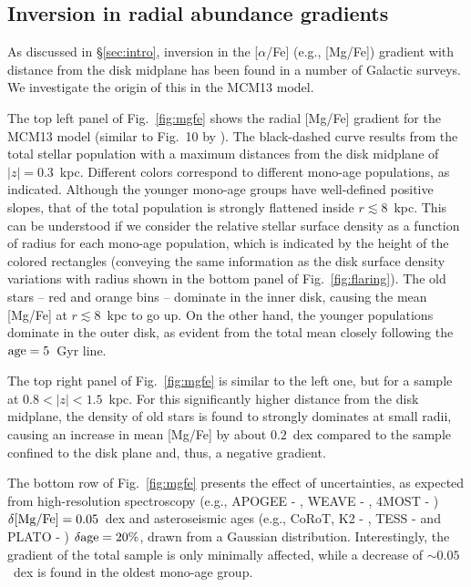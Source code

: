 \documentclass[usenatbib]{mnras}
\begin{document}
\subsection{Inversion in radial abundance gradients}
\label{sec:grad}

As discussed in \S\ref{sec:intro}, inversion in the [$\alpha$/Fe] (e.g., [Mg/Fe]) gradient with distance from the disk midplane has been found in a number of Galactic surveys. We investigate the origin of this in the MCM13 model.

The top left panel of Fig.~\ref{fig:mgfe} shows the radial [Mg/Fe] gradient for the MCM13 model (similar to Fig.~10 by \citealt{mcm14}). The black-dashed curve results from the total stellar population with a maximum distances from the disk midplane of $|z|=0.3$~kpc. Different colors correspond to different mono-age populations, as indicated. Although the younger mono-age groups have well-defined positive slopes, that of the total population is strongly flattened inside $r\lesssim8$~kpc. This can be understood if we consider the relative stellar surface density as a function of radius for each mono-age population, which is indicated by the height of the colored rectangles (conveying the same information as the disk surface density variations with radius shown in the bottom panel of Fig.~\ref{fig:flaring}). The old stars -- red and orange bins -- dominate in the inner disk, causing the mean [Mg/Fe] at $r\lesssim8$~kpc to go up. On the other hand, the younger populations dominate in the outer disk, as evident from the total mean closely following the $\rm age=5$~Gyr line.

The top right panel of Fig.~\ref{fig:mgfe} is similar to the left one, but for a sample at $0.8<|z|<1.5$~kpc. For this significantly higher distance from the disk midplane, the density of old stars is found to strongly dominates at small radii, causing an increase in mean [Mg/Fe] by about $0.2$~dex compared to the sample confined to the disk plane and, thus, a negative gradient.

The bottom row of Fig.~\ref{fig:mgfe} presents the effect of uncertainties, as expected from high-resolution spectroscopy (e.g., APOGEE - \citealt{majewski17}, WEAVE - \citealt{dalton12}, 4MOST - \citealt{dejong12}) $\rm\delta[Mg/Fe]=0.05$~dex and asteroseismic ages (e.g., CoRoT, K2 - \citealt{howell14}, TESS - \citealt{ricker15} and PLATO - \citealt{rauer14}) $\rm\delta age=20\%$, drawn from a Gaussian distribution. Interestingly, the gradient of the total sample is only minimally affected, while a decrease of $\sim0.05$~dex is found in the oldest mono-age group.
\end{document}
